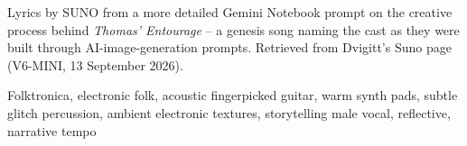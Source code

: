 
\label{sec:into-the-digital-night}
\begin{notes}
Lyrics by SUNO from a more detailed Gemini Notebook prompt on the creative process behind \emph{Thomas' Entourage} -- a genesis song naming the cast as they were built through AI-image-generation prompts. Retrieved from Dvigitt's Suno page (V6-MINI, 13 September 2026).
\end{notes}
\begin{style}
Folktronica, electronic folk, acoustic fingerpicked guitar, warm synth pads, subtle glitch percussion, ambient electronic textures, storytelling male vocal, reflective, narrative tempo
\end{style}
